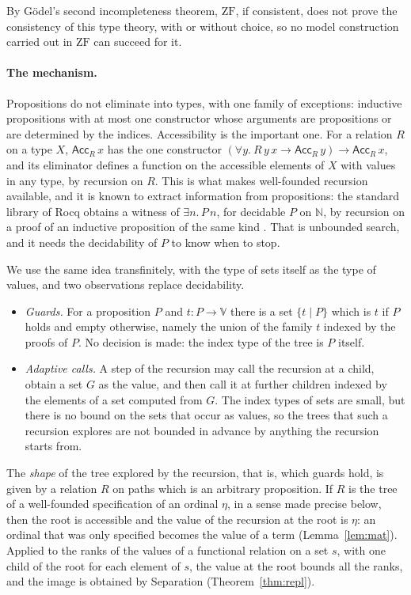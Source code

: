 \documentclass[10pt]{article}
\theoremstyle{definition}
\theoremstyle{remark}
\newcommand{\N}{\mathbb{N}}
\newcommand{\ZF}{\mathrm{ZF}}
\newcommand{\Acc}{\mathsf{Acc}}
\newcommand{\V}{\mathbb{V}}
\newcommand{\guard}[2]{\{#1\mid #2\}}
\begin{document}
By G\"odel's second incompleteness theorem, $\ZF$, if consistent, does
not prove the consistency of this type theory, with or without choice,
so no model construction carried out in $\ZF$ can succeed for it.

\paragraph{The mechanism.}
Propositions do not eliminate into types, with one family of exceptions:
inductive propositions with at most one constructor whose arguments are
propositions or are determined by the indices. Accessibility is the
important one. For a relation $R$ on a type $X$, $\Acc_R\,x$ has the one
constructor $(\forall y.\ R\,y\,x\to\Acc_R\,y)\to\Acc_R\,x$, and its eliminator
defines a function on the accessible elements of $X$ with values in any
type, by recursion on $R$. This is what makes well-founded recursion
available, and it is known to extract information from propositions:
the standard library of Rocq obtains a witness of $\exists n.\,P\,n$, for
decidable $P$ on $\N$, by recursion on a proof of an inductive
proposition of the same kind \cite{constructiveepsilon}. That is unbounded search, and it needs the
decidability of $P$ to know when to stop.

We use the same idea transfinitely, with the type of sets itself as the
type of values, and two observations replace decidability.
\begin{itemize}
\item \emph{Guards.} For a proposition $P$ and $t:P\to\V$ there is a set
  $\guard{t}{P}$ which is $t$ if $P$ holds and empty otherwise, namely
  the union of the family $t$ indexed by the proofs of $P$. No decision is made:
  the index type of the tree is $P$ itself.
\item \emph{Adaptive calls.} A step of the recursion may call the
  recursion at a child, obtain a set $G$ as the value, and then call it
  at further children indexed by the elements of a set computed from
  $G$. The index types of sets are small, but there is no bound on the
  sets that occur as values, so the trees that such a recursion explores
  are not bounded in advance by anything the recursion starts from.
\end{itemize}
The \emph{shape} of the tree explored by the recursion, that is, which
guards hold, is given by a relation $R$ on paths which is an arbitrary
proposition. If $R$ is the tree of a well-founded specification of an
ordinal $\eta$, in a sense made precise below, then the root is accessible
and the value of the recursion at the root is $\eta$: an ordinal that was
only specified becomes the value of a term
(Lemma~\ref{lem:mat}). Applied to the ranks of the values of a
functional relation on a set $s$, with one child of the root for each
element of $s$, the value at the root bounds all the ranks, and the
image is obtained by Separation (Theorem~\ref{thm:repl}).
\end{document}
